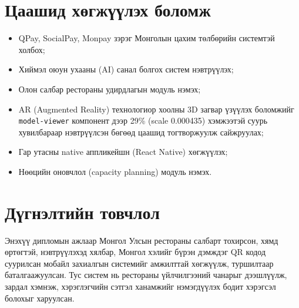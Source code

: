 \section*{Цаашид хөгжүүлэх боломж}

\begin{itemize}
  \item QPay, SocialPay, Monpay зэрэг Монголын цахим төлбөрийн системтэй холбох;
  \item Хиймэл оюун ухааны (AI) санал болгох систем нэвтрүүлэх;
  \item Олон салбар рестораны удирдлагын модуль нэмэх;
  \item AR (Augmented Reality) технологиор хоолны 3D загвар үзүүлэх боломжийг
    \texttt{model-viewer} компонент дээр 29\% (scale 0.000435) хэмжээтэй
    суурь хувилбараар нэвтрүүлсэн бөгөөд цаашид тогтворжуулж сайжруулах;
  \item Гар утасны native аппликейшн (React Native) хөгжүүлэх;
  \item Нөөцийн оновчлол (capacity planning) модуль нэмэх.
\end{itemize}

\section*{Дүгнэлтийн товчлол}

Энэхүү дипломын ажлаар Монгол Улсын рестораны салбарт тохирсон, хямд өртөгтэй,
нэвтрүүлэхэд хялбар, Монгол хэлийг бүрэн дэмждэг QR кодод суурилсан мобайл
захиалгын системийг амжилттай хөгжүүлж, туршилтаар баталгаажуулсан. Тус систем нь
рестораны үйлчилгээний чанарыг дээшлүүлж, зардал хэмнэж, хэрэглэгчийн сэтгэл
ханамжийг нэмэгдүүлэх бодит хэрэгсэл болохыг харуулсан.
